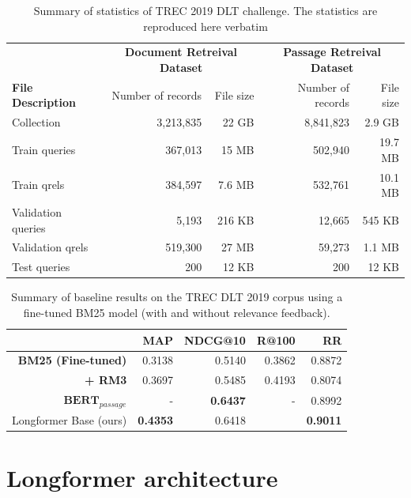 \documentclass[sigconf, nonacm=true]{acmart}
\begin{document}
\begin{table}[!htb]
  \caption{Summary of statistics of TREC 2019 DLT challenge. The statistics are reproduced here verbatim \cite{Craswell2020OverviewOT}}
  \label{datastats}
  \begin{tabular}{l*4r}
    \toprule
    & \multicolumn{2}{c}{\textbf{Document Retreival Dataset}} & \multicolumn{2}{c}{\textbf{Passage Retreival Dataset}} \\
    \textbf{File Description} & Number of records & File size & Number of records & File size \\
    \midrule
    Collection & 3,213,835 & 22 GB & 8,841,823 & 2.9 GB \\
    Train queries & 367,013 & 15 MB & 502,940 & 19.7 MB\\
    Train qrels & 384,597 & 7.6 MB & 532,761 &  10.1 MB \\
    Validation queries  & 5,193 & 216 KB & 12,665 & 545 KB \\
    Validation qrels    & 519,300 & 27 MB & 59,273 & 1.1 MB \\
    Test queries        & 200 & 12 KB & 200 & 12 KB \\
  \bottomrule
\end{tabular}
\end{table}

\begin{table}[!htb]
  \caption{Summary of baseline results on the TREC DLT 2019 corpus using a fine-tuned BM25 model (with and without relevance feedback).}
  \label{baseline-stats}
  \begin{tabular}{rrrrr}
    \toprule
    & MAP & NDCG@10 & R@100 & RR  \\
    \midrule
    \textbf{BM25 (Fine-tuned)} & 0.3138 & 0.5140 & 0.3862  & 0.8872 \\
    \textbf{\;\; + RM3} & 0.3697 & 0.5485 & 0.4193 & 0.8074 \\
    $\textbf{BERT}_{passage}$ \cite{Chen2019UCASAT} & - &  \textbf{0.6437} & - & 0.8992 \\
    Longformer Base (ours) & \textbf{0.4353} & 0.6418 &  & \textbf{0.9011} \\
    \bottomrule
  \end{tabular}
\end{table}

\section{Longformer architecture} \label{background}
\end{document}
